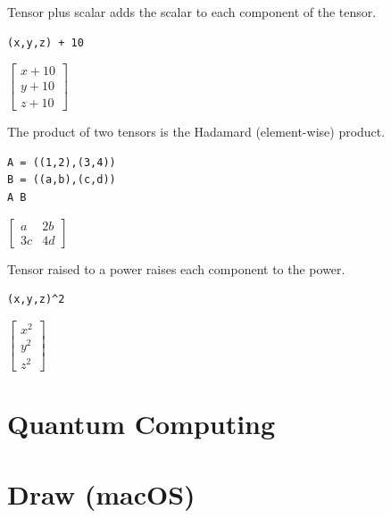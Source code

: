 \documentclass[12pt]{article}
\begin{document}
Tensor plus scalar adds the scalar to each component of the tensor.

{\color{blue}
\begin{verbatim}
(x,y,z) + 10
\end{verbatim}
}

$\displaystyle
\begin{bmatrix}
x+10
\\[1ex]
y+10
\\[1ex]
z+10
\end{bmatrix}
$

\bigskip

The product of two tensors is the Hadamard (element-wise) product.

{\color{blue}
\begin{verbatim}
A = ((1,2),(3,4))
B = ((a,b),(c,d))
A B
\end{verbatim}
}

$\displaystyle
\begin{bmatrix}
a & 2b
\\[1ex]
3c & 4d
\end{bmatrix}
$

\bigskip

Tensor raised to a power raises each component to the power.

{\color{blue}
\begin{verbatim}
(x,y,z)^2
\end{verbatim}
}

$\displaystyle
\begin{bmatrix}
x^2
\\[1ex]
y^2
\\[1ex]
z^2
\end{bmatrix}
$

\newpage

















\newpage

\section{Quantum Computing}



\newpage

\section{Draw (macOS)}



\newpage



\newpage


\end{document}
